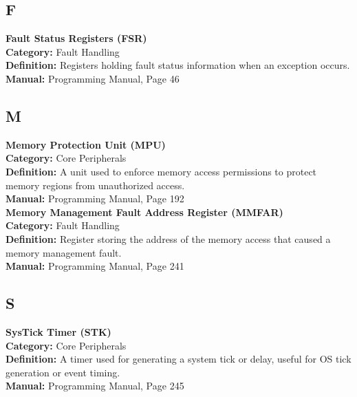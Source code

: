 \documentclass{article}
\begin{document}
\subsection*{F}
\textbf{Fault Status Registers (FSR)} \\
\textbf{Category:} Fault Handling \\
\textbf{Definition:} Registers holding fault status information when an exception occurs. \\
\textbf{Manual:} Programming Manual, Page 46 \\

\subsection*{M}
\textbf{Memory Protection Unit (MPU)} \\
\textbf{Category:} Core Peripherals \\
\textbf{Definition:} A unit used to enforce memory access permissions to protect memory regions from unauthorized access. \\
\textbf{Manual:} Programming Manual, Page 192 \\

\textbf{Memory Management Fault Address Register (MMFAR)} \\
\textbf{Category:} Fault Handling \\
\textbf{Definition:} Register storing the address of the memory access that caused a memory management fault. \\
\textbf{Manual:} Programming Manual, Page 241 \\

\subsection*{S}
\textbf{SysTick Timer (STK)} \\
\textbf{Category:} Core Peripherals \\
\textbf{Definition:} A timer used for generating a system tick or delay, useful for OS tick generation or event timing. \\
\textbf{Manual:} Programming Manual, Page 245 \\
\end{document}
